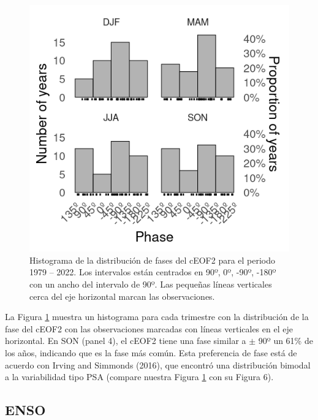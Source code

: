 \documentclass[12pt,oneside]{reedthesis}
\begin{document}
\begin{figure}
\includegraphics{figures/40-sam-ceof/phase-histogram-1} \caption{Histograma de la distribución de fases del cEOF2 para el periodo 1979 -- 2022.
Los intervalos están centrados en 90º, 0º, -90º, -180º con un ancho del intervalo de 90º.
Las pequeñas líneas verticales cerca del eje horizontal marcan las observaciones.}\label{fig:phase-histogram}
\end{figure}

La Figura \ref{fig:phase-histogram} muestra un histograma para cada trimestre con la distribución de la fase del cEOF2 con las observaciones marcadas con líneas verticales en el eje horizontal.
En SON (panel 4), el cEOF2 tiene una fase similar a \(\pm\) 90º un 61\% de los años, indicando que es la fase más común.
Esta preferencia de fase está de acuerdo con Irving and Simmonds (2016), que encontró una distribución bimodal a la variabilidad tipo PSA (compare nuestra Figura \ref{fig:phase-histogram} con su Figura 6).


\hypertarget{enso}{%
\subsection{ENSO}\label{enso}}

\end{document}
